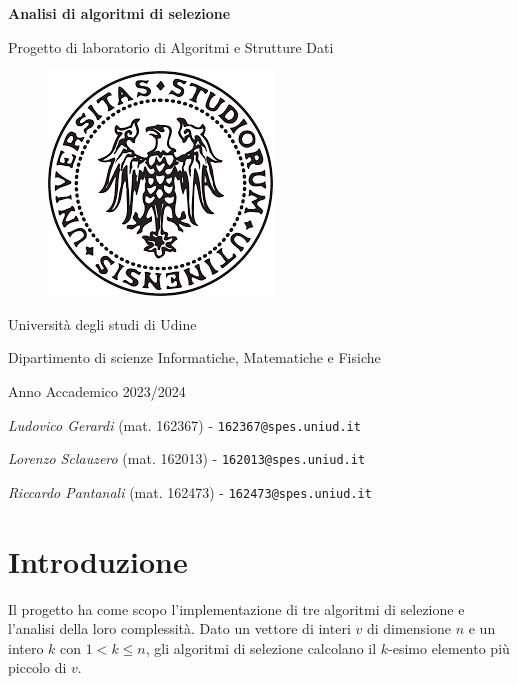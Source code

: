 \documentclass[a4paper]{article}
\begin{document}
\begin{titlepage} %
    \begin{center}
        \vspace*{1cm}
        {\Huge\bfseries Analisi di algoritmi di selezione\par}
        \vspace{.5cm}
        {\LARGE Progetto di laboratorio di Algoritmi e Strutture Dati\par}
        \vspace{1cm}
        \begin{figure}[h]
            \centering
            \includegraphics[width=.5\textwidth]{photo/uniud_logo.png}
        \end{figure}
        \vspace{1.5cm}
        {\LARGE Università degli studi di Udine\par}
        {\LARGE Dipartimento di scienze Informatiche, Matematiche e Fisiche\par}
        \vspace{.5cm}
        {\Large Anno Accademico 2023/2024\par}
        \vfill
	    {\Large \textit{Ludovico Gerardi} (mat. 162367) - \texttt{162367@spes.uniud.it} \par}
	    {\Large \textit{Lorenzo Sclauzero} (mat. 162013) - \texttt{162013@spes.uniud.it} \par}
	    {\Large \textit{Riccardo Pantanali} (mat. 162473) - \texttt{162473@spes.uniud.it} \par}
    \end{center}
\end{titlepage}



\section{Introduzione}
Il progetto ha come scopo l'implementazione di tre algoritmi di selezione e l'analisi della loro complessità.
Dato un vettore di interi $v$ di dimensione $n$ e un intero $k$ con $1 < k \le n$, gli algoritmi di selezione calcolano il $k$-esimo elemento più piccolo di $v$.
\end{document}

